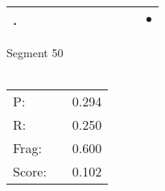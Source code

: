 \documentclass[landscape]{article}
\newcommand{\ssp}{\hspace{2pt}}
\newcommand{\mex}{\cellcolor{g}$\bullet$}
\begin{document}
\begin{tabular}{|l|p{10pt}|p{10pt}|p{10pt}|p{10pt}|p{10pt}|p{10pt}|p{10pt}|p{10pt}|p{10pt}|p{10pt}|}
\hline
\ssp \cellcolor{ref9}. \ssp&\hspace{2pt}&\hspace{2pt}&\hspace{2pt}&\hspace{2pt}&\hspace{2pt}&\hspace{2pt}&\hspace{2pt}&\hspace{2pt}&\hspace{2pt}&\hspace{2pt}\mex\\
\hline
\end{tabular}

\vspace{6pt}
\noindent Segment 50\\\\
\noindent\begin{tabular}{lm{12pt}r}
\hline
P:&&0.294\\
R:&&0.250\\
Frag:&&0.600\\
Score:&&0.102\\
\end{tabular}

\newpage
\end{document}

